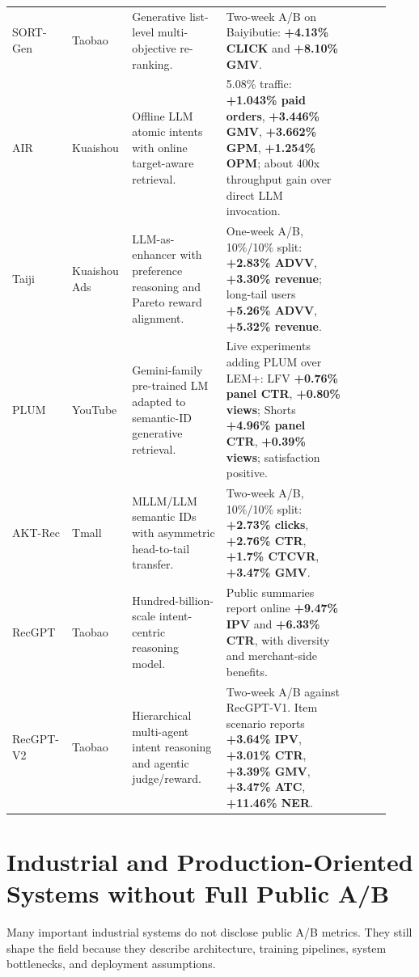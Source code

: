 \documentclass[11pt]{article}
\newcommand{\metric}[1]{\textbf{#1}}
\begin{document}
\begin{longtable}{@{}p{0.12\linewidth}p{0.15\linewidth}p{0.24\linewidth}p{0.32\linewidth}p{0.10\linewidth}@{}}
SORT-Gen & Taobao & Generative list-level multi-objective re-ranking. & Two-week A/B on Baiyibutie: \metric{+4.13\% CLICK} and \metric{+8.10\% GMV}. & \cite{sortgen}\\
AIR & Kuaishou & Offline LLM atomic intents with online target-aware retrieval. & 5.08\% traffic: \metric{+1.043\% paid orders}, \metric{+3.446\% GMV}, \metric{+3.662\% GPM}, \metric{+1.254\% OPM}; about 400x throughput gain over direct LLM invocation. & \cite{air}\\
Taiji & Kuaishou Ads & LLM-as-enhancer with preference reasoning and Pareto reward alignment. & One-week A/B, 10\%/10\% split: \metric{+2.83\% ADVV}, \metric{+3.30\% revenue}; long-tail users \metric{+5.26\% ADVV}, \metric{+5.32\% revenue}. & \cite{taiji}\\
PLUM & YouTube & Gemini-family pre-trained LM adapted to semantic-ID generative retrieval. & Live experiments adding PLUM over LEM+: LFV \metric{+0.76\% panel CTR}, \metric{+0.80\% views}; Shorts \metric{+4.96\% panel CTR}, \metric{+0.39\% views}; satisfaction positive. & \cite{plum}\\
AKT-Rec & Tmall & MLLM/LLM semantic IDs with asymmetric head-to-tail transfer. & Two-week A/B, 10\%/10\% split: \metric{+2.73\% clicks}, \metric{+2.76\% CTR}, \metric{+1.7\% CTCVR}, \metric{+3.47\% GMV}. & \cite{aktrec}\\
RecGPT & Taobao & Hundred-billion-scale intent-centric reasoning model. & Public summaries report online \metric{+9.47\% IPV} and \metric{+6.33\% CTR}, with diversity and merchant-side benefits. & \cite{recgpt}\\
RecGPT-V2 & Taobao & Hierarchical multi-agent intent reasoning and agentic judge/reward. & Two-week A/B against RecGPT-V1. Item scenario reports \metric{+3.64\% IPV}, \metric{+3.01\% CTR}, \metric{+3.39\% GMV}, \metric{+3.47\% ATC}, \metric{+11.46\% NER}. & \cite{recgptv2}\\
\bottomrule
\end{longtable}
\normalsize

\section{Industrial and Production-Oriented Systems without Full Public A/B}

Many important industrial systems do not disclose public A/B metrics. They still shape the field because they describe architecture, training pipelines, system bottlenecks, and deployment assumptions.
\end{document}
